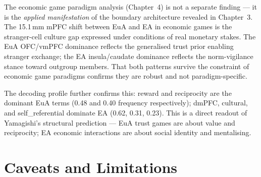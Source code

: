 \documentclass[11pt,a4paper]{article}
\begin{document}
The economic game paradigm analysis (Chapter~4) is not a separate finding — it is the
\emph{applied manifestation} of the boundary architecture revealed in Chapter~3. The 15.1\,mm
mPFC shift between EuA and EA in economic games is the stranger-cell culture gap expressed
under conditions of real monetary stakes. The EuA OFC/vmPFC dominance reflects the
generalised trust prior enabling stranger exchange; the EA insula/caudate dominance
reflects the norm-vigilance stance toward outgroup members. That both patterns survive
the constraint of economic game paradigms confirms they are robust and not paradigm-specific.

The decoding profile further confirms this: reward and reciprocity are the dominant
EuA terms (0.48 and 0.40 frequency respectively); dmPFC, cultural, and self\_referential
dominate EA (0.62, 0.31, 0.23). This is a direct readout of Yamagishi's structural
prediction — EuA trust games are about value and reciprocity; EA economic interactions
are about social identity and mentalising.

\section{Caveats and Limitations}
\end{document}
